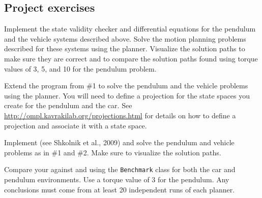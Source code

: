 \documentclass{comp450}
\begin{document}
\subsection*{Project exercises}
\begin{enumerate*}
	\item
	      Implement the state validity checker and differential equations for the pendulum and the vehicle systems described above.
	      Solve the motion planning problems described for these systems using the  planner.
	      Visualize the solution paths to make sure they are correct and to compare the solution paths found using torque values of 3, 5, and 10 for the pendulum problem.

	\item
	      Extend the program from \#1 to solve the pendulum and the vehicle problems using the  planner.
	      You will need to define a projection for the state spaces you create for the pendulum and the car.
	      See \url{http://ompl.kavrakilab.org/projections.html} for details on how to define a projection and associate it with a state space.

	\item
	      Implement  (see Shkolnik et al., 2009) and solve the pendulum and vehicle problems as in \#1 and \#2.
	      Make sure to visualize the solution paths.

	\item
	      Compare your  against  and  using the \ompl \texttt{Benchmark} class for both the car and pendulum environments.
	      Use a torque value of 3 for the pendulum.
	      Any conclusions must come from at least 20 independent runs of each planner.
\end{enumerate*}
\end{document}
